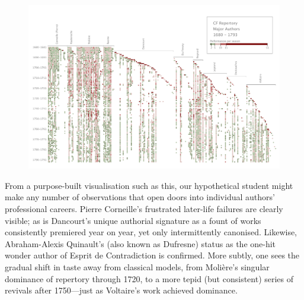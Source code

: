\documentclass[	DIV=calc,%
							paper=a4,%
							fontsize=11pt,%
							twocolumn]{scrartcl}	 					%
\begin{document}
\begin{figure}
  \centering
	\includegraphics[width=10in,angle=270]{viz/repertoire_by_season.pdf}
	\caption{}
  \label{fig:heatmap}
\end{figure}

From a purpose-built visualisation such as this, our hypothetical student might make any number of observations that open doors into individual authors’ professional careers.  Pierre Corneille’s frustrated later-life failures are clearly visible; as is Dancourt’s unique authorial signature as a fount of works consistently premiered year on year, yet only intermittently canonised.  Likewise, Abraham-Alexis Quinault’s (also known as Dufresne) status as the one-hit wonder author of Esprit de Contradiction is confirmed.  More subtly, one sees the gradual shift in taste away from classical models, from Molière’s singular dominance of repertory through 1720, to a more tepid (but consistent) series of revivals after 1750—just as Voltaire’s work achieved dominance.
\end{document}
